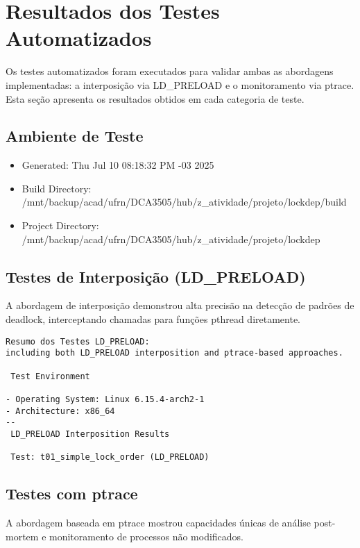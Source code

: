 \section{Resultados dos Testes Automatizados}\label{sec:test_results}

Os testes automatizados foram executados para validar ambas as abordagens implementadas:
a interposição via LD\_PRELOAD e o monitoramento via ptrace. Esta seção apresenta
os resultados obtidos em cada categoria de teste.

\subsection{Ambiente de Teste}

\begin{itemize}
\item Generated: Thu Jul 10 08:18:32 PM -03 2025
\item Build Directory: /mnt/backup/acad/ufrn/DCA3505/hub/z\_atividade/projeto/lockdep/build
\item Project Directory: /mnt/backup/acad/ufrn/DCA3505/hub/z\_atividade/projeto/lockdep
\end{itemize}

\subsection{Testes de Interposição (LD\_PRELOAD)}

A abordagem de interposição demonstrou alta precisão na detecção de padrões
de deadlock, interceptando chamadas para funções pthread diretamente.

\begin{verbatim}
Resumo dos Testes LD_PRELOAD:
including both LD_PRELOAD interposition and ptrace-based approaches.

 Test Environment

- Operating System: Linux 6.15.4-arch2-1
- Architecture: x86_64
--
 LD_PRELOAD Interposition Results

 Test: t01_simple_lock_order (LD_PRELOAD)
\end{verbatim}

\subsection{Testes com ptrace}

A abordagem baseada em ptrace mostrou capacidades únicas de análise
post-mortem e monitoramento de processos não modificados.

